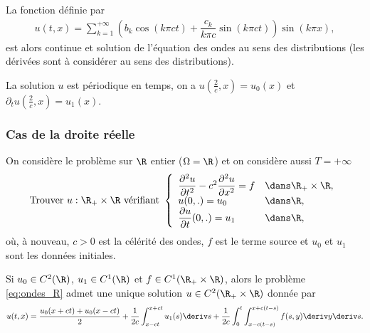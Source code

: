 \documentclass[12pt,a4paper,twoside]{article}
\begin{document}
La fonction d\'efinie par
\begin{align*}
  u(t,x) = \sum\limits_{k=1}^{+\infty} ( b_k \cos(k \pi c t) + \dfrac{c_k}{k \pi c} \sin(k \pi c t) ) 
  \sin(k \pi x) ,
\end{align*}
est alors continue et solution de l'\'equation des ondes au sens des distributions
(les d\'eriv\'ees sont \`a consid\'erer au sens des distributions).


\begin{remark}
  La solution $u$ est p\'eriodique en temps, on a $u(\frac{2}{c}, x) = u_0(x)$
  et $\partial_t u(\frac{2}{c}, x) = u_1(x)$.
\end{remark}


\subsubsection{Cas de la droite r\'eelle}

On consid\`ere le probl\`eme sur $\R$ entier ($\Omega = \R$) et on consid\`ere aussi $T = + \infty$
\begin{equation}
  \label{eq:ondes_R}
  \text{Trouver $u : \R_+ \times \R$ v\'erifiant  }
  \left\{
    \begin{array}{l l}
      \dfrac{\partial^2 u}{\partial t^2} - c^2 \dfrac{\partial^2 u}{\partial x^2} = f 
      &\dans \R_+ \times \R ,
      \\
      u(0,.) = u_0 
      & \dans \R ,
      \\
      \dfrac{\partial u}{\partial t}(0,.) = u_1 
      & \dans \R ,
    \end{array}
  \right.
\end{equation}
o\`u, \`a nouveau, $c > 0$ est la c\'el\'erit\'e des ondes, $f$ est le terme source
et $u_0$ et $u_1$ sont les donn\'ees initiales.


\begin{theorem}
  \label{thm:d_Alembert}
  Si $u_0 \in C^2(\R)$, $u_1 \in C^1(\R)$ et $f \in C^1(\R_+ \times \R)$,
  alors le probl\`eme \eqref{eq:ondes_R} admet une unique solution 
  $u \in C^2(\R_+ \times \R)$ donn\'ee par 
  \begin{align*}
    u(t,x) = \dfrac{u_0(x+ct) + u_0(x-ct)}{2} 
    + \dfrac{1}{2c} \int_{x-ct}^{x+ct} u_1(s) \deriv s
    + \dfrac{1}{2c} \int_0^t \int_{x - c(t-s)}^{x+c(t-s)} f(s,y) \deriv y \deriv s .
  \end{align*}
\end{theorem}
\end{document}
